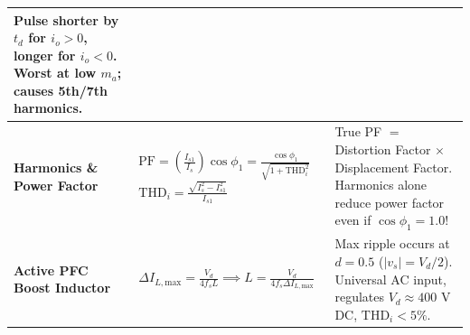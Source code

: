 \documentclass[11pt,a4paper]{article}
\begin{document}
\begin{table}[htbp]
\begin{tabularx}{\textwidth}{l p{5.5cm} X}
Pulse shorter by $t_d$ for $i_o>0$, longer for $i_o<0$. \newline
Worst at low $m_a$; causes 5th/7th harmonics. \\
\midrule
\textbf{Harmonics \& Power Factor} &
$\text{PF} = \left(\frac{I_{s1}}{I_s}\right) \cos\phi_1 = \frac{\cos\phi_1}{\sqrt{1 + \text{THD}_i^2}}$ \newline
$\text{THD}_i = \frac{\sqrt{I_s^2 - I_{s1}^2}}{I_{s1}}$ &
True PF $=$ Distortion Factor $\times$ Displacement Factor. \newline
Harmonics alone reduce power factor even if $\cos\phi_1 = 1.0$! \\
\midrule
\textbf{Active PFC Boost Inductor} &
$\Delta I_{L,\text{max}} = \frac{V_d}{4 f_s L} \implies L = \frac{V_d}{4 f_s \Delta I_{L,\text{max}}}$ &
Max ripple occurs at $d=0.5$ ($|v_s| = V_d/2$). \newline
Universal AC input, regulates $V_d \approx 400\text{ V}$ DC, $\text{THD}_i < 5\%$. \\
\bottomrule
\end{tabularx}
\end{table}
\end{document}
